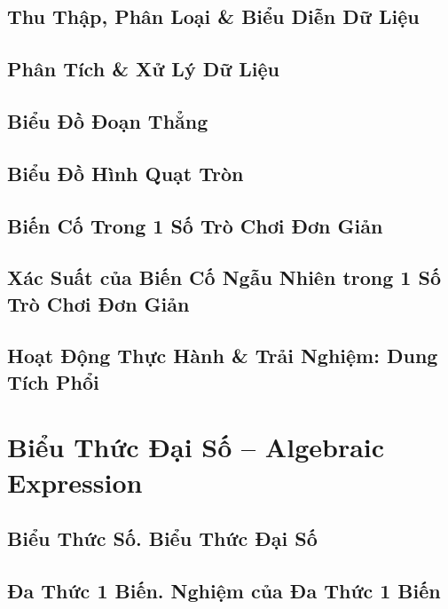 \documentclass[oneside]{book}
\numberwithin{equation}{section}
\begin{document}
\section{Thu Thập, Phân Loại \& Biểu Diễn Dữ Liệu}

\section{Phân Tích \& Xử Lý Dữ Liệu}

\section{Biểu Đồ Đoạn Thẳng}

\section{Biểu Đồ Hình Quạt Tròn}

\section{Biến Cố Trong 1 Số Trò Chơi Đơn Giản}

\section{Xác Suất của Biến Cố Ngẫu Nhiên trong 1 Số Trò Chơi Đơn Giản}

\section{Hoạt Động Thực Hành \& Trải Nghiệm: Dung Tích Phổi}


\chapter{Biểu Thức Đại Số -- Algebraic Expression}

\section{Biểu Thức Số. Biểu Thức Đại Số}

\section{Đa Thức 1 Biến. Nghiệm của Đa Thức 1 Biến}
\end{document}
